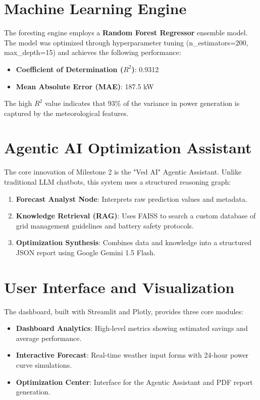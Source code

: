 \documentclass[12pt,a4paper]{article}
\begin{document}
\section{Machine Learning Engine}
The foresting engine employs a \textbf{Random Forest Regressor} ensemble model. The model was optimized through hyperparameter tuning (n\_estimators=200, max\_depth=15) and achieves the following performance:
\begin{itemize}
    \item \textbf{Coefficient of Determination ($R^2$)}: 0.9312
    \item \textbf{Mean Absolute Error (MAE)}: 187.5 kW
\end{itemize}
The high $R^2$ value indicates that 93\% of the variance in power generation is captured by the meteorological features.

\section{Agentic AI Optimization Assistant}
The core innovation of Milestone 2 is the "Ved AI" Agentic Assistant. Unlike traditional LLM chatbots, this system uses a structured reasoning graph:
\begin{enumerate}
    \item \textbf{Forecast Analyst Node}: Interprets raw prediction values and metadata.
    \item \textbf{Knowledge Retrieval (RAG)}: Uses FAISS to search a custom database of grid management guidelines and battery safety protocols.
    \item \textbf{Optimization Synthesis}: Combines data and knowledge into a structured JSON report using Google Gemini 1.5 Flash.
\end{enumerate}

\section{User Interface and Visualization}
The dashboard, built with Streamlit and Plotly, provides three core modules:
\begin{itemize}
    \item \textbf{Dashboard Analytics}: High-level metrics showing estimated savings and average performance.
    \item \textbf{Interactive Forecast}: Real-time weather input forms with 24-hour power curve simulations.
    \item \textbf{Optimization Center}: Interface for the Agentic Assistant and PDF report generation.
\end{itemize}
\end{document}
